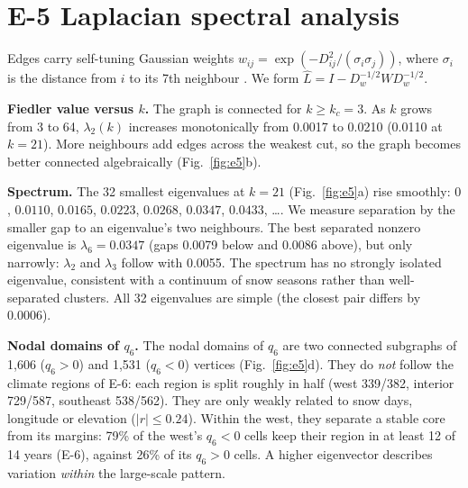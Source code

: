 \documentclass[11pt]{article}
\begin{document}
\section*{E-5 \quad Laplacian spectral analysis}

Edges carry self-tuning Gaussian weights $w_{ij} = \exp(-D_{ij}^2/(\sigma_i\sigma_j))$,
where $\sigma_i$ is the distance from $i$ to its 7th neighbour \cite{zelnik2004}. We form
$\hat L = I - D_w^{-1/2} W D_w^{-1/2}$.

\textbf{Fiedler value versus $k$.} The graph is connected for $k \ge k_c = 3$. As $k$
grows from 3 to 64, $\lambda_2(k)$ increases monotonically from 0.0017 to 0.0210 (0.0110 at
$k=21$). More neighbours add edges across the weakest cut, so the graph becomes better
connected algebraically (Fig.~\ref{fig:e5}b).

\textbf{Spectrum.} The 32 smallest eigenvalues at $k = 21$ (Fig.~\ref{fig:e5}a) rise
smoothly: $0$, $0.0110$, $0.0165$, $0.0223$, $0.0268$, $0.0347$, $0.0433$, \dots. We
measure separation by the smaller gap to an eigenvalue's two neighbours. The best
separated nonzero eigenvalue is $\lambda_6 = 0.0347$ (gaps 0.0079 below and 0.0086 above),
but only narrowly: $\lambda_2$ and $\lambda_3$ follow with 0.0055. The spectrum has no
strongly isolated eigenvalue, consistent with a continuum of snow seasons rather than
well-separated clusters. All 32 eigenvalues are simple (the closest pair differs by
0.0006).

\textbf{Nodal domains of $q_6$.} The nodal domains of $q_6$ are two connected subgraphs
of 1,606 ($q_6>0$) and 1,531 ($q_6<0$) vertices (Fig.~\ref{fig:e5}d). They do
\emph{not} follow the climate regions of E-6: each region is split roughly in half
(west 339/382, interior 729/587, southeast 538/562). They are only weakly related to snow
days, longitude or elevation ($|r| \le 0.24$). Within the west, they separate a stable
core from its margins: 79\% of the west's $q_6<0$ cells keep their region in at least
12 of 14 years (E-6), against 26\% of its $q_6>0$ cells. A higher eigenvector describes
variation \emph{within} the large-scale pattern.
\end{document}
